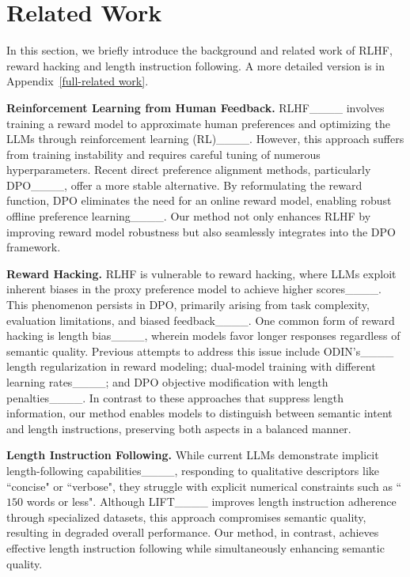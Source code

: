 \section{Related Work}
\label{related-work}

In this section, we briefly introduce the background and related work of RLHF, reward hacking and length instruction following. A more detailed version is in Appendix~\ref{full-related work}.

{\bf Reinforcement Learning from Human Feedback.} RLHF____ involves training a reward model to approximate human preferences and optimizing the LLMs through reinforcement learning (RL)____. However, this approach suffers from training instability and requires careful tuning of numerous hyperparameters. Recent direct preference alignment methods, particularly DPO____, offer a more stable alternative. By reformulating the reward function, DPO eliminates the need for an online reward model, enabling robust offline preference learning____. Our method not only enhances RLHF by improving reward model robustness but also seamlessly integrates into the DPO framework.

{\bf Reward Hacking.} RLHF is vulnerable to reward hacking, where LLMs exploit inherent biases in the proxy preference model to achieve higher scores____. This phenomenon persists in DPO, primarily arising from task complexity, evaluation limitations, and biased feedback____. One common form of reward hacking is length bias____, wherein models favor longer responses regardless of semantic quality. Previous attempts to address this issue include ODIN's____ length regularization in reward modeling; dual-model training with different learning rates____; and DPO objective modification with length penalties____. In contrast to these approaches that suppress length information, our method enables models to distinguish between semantic intent and length instructions, preserving both aspects in a balanced manner.

{\bf Length Instruction Following.} While current LLMs demonstrate implicit length-following capabilities____, responding to qualitative descriptors like ``concise" or ``verbose", they struggle with explicit numerical constraints such as ``$150$ words or less". Although LIFT____ improves length instruction adherence through specialized datasets, this approach compromises semantic quality, resulting in degraded overall performance. Our method, in contrast, achieves effective length instruction following while simultaneously enhancing semantic quality.